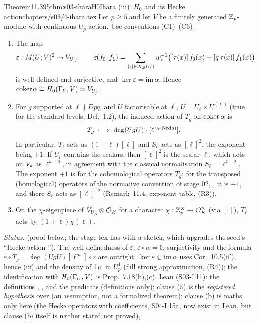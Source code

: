 \begin{quoted}{Theorem}{11.3}{95}{thm:s03-iharaH0}{Ihara (iii): $H_0$ and its Hecke action}{chapters/s03/4-ihara.tex}\label{rpt:thm:s03-iharaH0}
Let $p\ge5$ and let $V$ be a finitely generated $\mathbb{Z}_p$-module with continuous $U_p$-action. Use conventions (C1)--(C6).
\begin{enumerate}[label=(\alph*)]
\item The map
  \[\varepsilon:M(U;V)^2\to V_{U^1_p},\qquad \varepsilon(f_0,f_1)=\sum_{[x]\in X_B(U)}w_x^{-1}\big([\tau(x)]\,f_0(x)+[q\,\tau(x)]\,f_1(x)\big)\]
  is well defined and surjective, and $\ker\varepsilon=\mathrm{im}\,\alpha$. Hence $\operatorname{coker}\alpha\cong H_0(\Gamma_U,V)=V_{U^1_p}$.
\item For $g$ supported at $\ell\nmid Dpq$, and $U$ factorisable at $\ell$, $U=U_\ell\times U^{(\ell)}$ (true for the standard levels,
  Def.~1.2), the induced action of $T_g$ on $\operatorname{coker}\alpha$ is
  \[T_g\ \longmapsto\ \deg(UgU)\cdot[\ell^{\,v_\ell(\Nrd g)}].\]
  In particular, $T_\ell$ acts as $(1+\ell)[\ell]$ and $S_\ell$ acts as $[\ell]^2$, the exponent being $+1$. If $U_p$ contains
  the scalars, then $[\ell]^2$ is the scalar $\ell$, which acts on $V_k$ as $\ell^{k-2}$, in agreement with the classical
  normalisation $S_\ell=\ell^{k-2}$. The exponent $+1$ is for the cohomological operators $T_g$; for the transposed (homological) operators of the normative convention of stage 02, , it is $-1$, and there $S_\ell$ acts as $[\ell]^{-2}$ (Remark~11.4,
  exponent table, (R3)).
\item On the $\chi$-eigenpiece of $V_{U^1_p}\otimes\mathcal{O}_E$ for a character $\chi:\mathbb{Z}_p^\times\to\mathcal{O}_E^\times$ (via $[\cdot]$), $T_\ell$ acts by
  $(1+\ell)\chi(\ell)$.
\end{enumerate}
\emph{Status.} \stpmc{} (proof below; the stage tex has \sttoprove{} with a sketch, which upgrades the seed's ``Hecke action \stsketch''). The
well-definedness of $\varepsilon$, $\varepsilon\circ\alpha=0$, surjectivity and the formula $\varepsilon\circ T_g=\deg(UgU)[\ell^m]\circ\varepsilon$ are \stproved{}
outright; $\ker\varepsilon\subseteq\mathrm{im}\,\alpha$ uses Cor.~10.5(ii$'$), hence (iii) and the density of $\Gamma_U$ in $U^1_p$ (full strong
approximation, (R4)); the identification with $H_0(\Gamma_U,V)$ is Prop.~7.18(b),(c). Lean (S03-L11): the definitions , ,  and the predicate
 \stformal{} (definitions only); clause (a) is the \emph{registered hypothesis}  over
 (an assumption, not a formalized theorem); clause (b) is
maths only here (the Hecke operators with coefficients, S04-L15a, now exist in Lean, but clause (b) itself is neither stated nor proved), \leanplanned
\end{quoted}
